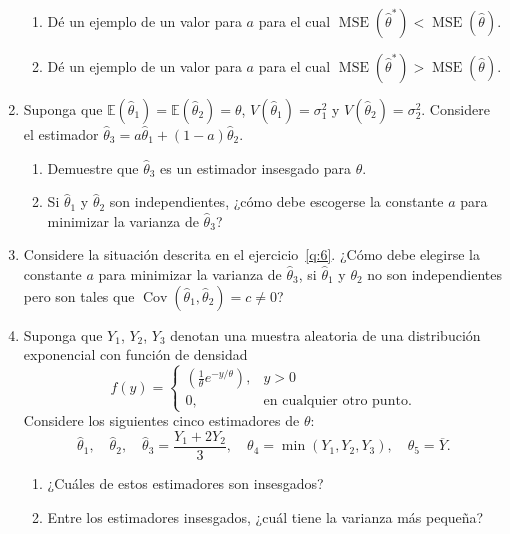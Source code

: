 \documentclass[a4paper]{scrreprt}
\begin{document}
\begin{enumerate}
\begin{enumerate}
		\item\label{q:5.b} Dé un ejemplo de un valor para $a$ para el cual $\operatorname{MSE}\left(\hat{\theta}^{\ast}\right)<\operatorname{MSE}\left(\hat{\theta}\right)$.
		\item\label{q:5.c} Dé un ejemplo de un valor para $a$ para el cual $\operatorname{MSE}\left(\hat{\theta}^{\ast}\right)>\operatorname{MSE}\left(\hat{\theta}\right)$.
	\end{enumerate}
	\item\label{q:6} Suponga que $\mathds{E}\left(\hat{\theta}_{1}\right)=\mathds{E}\left(\hat{\theta}_{2}\right)=\theta$, $V\left(\hat{\theta}_{1}\right)=\sigma^{2}_{1}$ y $V\left(\hat{\theta}_{2}\right)=\sigma^{2}_{2}$. Considere el estimador $\hat{\theta}_{3}=a\hat{\theta}_{1}+\left(1-a\right)\hat{\theta}_{2}$.
	\begin{enumerate}
		\item\label{q:6.a} Demuestre que $\hat{\theta}_{3}$ es un estimador insesgado para $\theta$.
		\item\label{q:6.b} Si $\hat{\theta}_{1}$ y $\hat{\theta}_{2}$ son independientes, ¿cómo debe escogerse la constante $a$ para minimizar la varianza de $\hat{\theta}_{3}$?
	\end{enumerate}
\item\label{q:7} Considere la situación descrita en el ejercicio~\eqref{q:6}. ¿Cómo debe elegirse la constante $a$ para minimizar la varianza de $\hat{\theta}_{3}$, si $\hat{\theta}_{1}$ y $\theta_{2}$ no son independientes pero son tales que $\operatorname{Cov}\left(\hat{\theta}_{1},\hat{\theta}_{2}\right)=c\neq0$?
\item Suponga que $Y_{1}$, $Y_{2}$, $Y_{3}$ denotan una muestra aleatoria de una distribución exponencial con función de densidad \[ f\left(y\right)=\begin{cases}\left(\frac{1}{\theta}e^{-y/\theta}\right),& y>0\\0,&\text{en cualquier otro punto}.\end{cases} \] Considere los siguientes cinco estimadores de $\theta$: \[ \hat{\theta}_{1},\quad\hat{\theta}_{2},\quad\hat{\theta}_{3}=\frac{Y_{1}+2Y_{2}}{3},\quad\theta_{4}=\min\left(Y_{1},Y_{2},Y_{3}\right),\quad\theta_{5}=\overline{Y}. \]
\begin{enumerate}
	\item ¿Cuáles de estos estimadores son insesgados?
	\item Entre los estimadores insesgados, ¿cuál tiene la varianza más pequeña?
\end{enumerate}

\end{enumerate}
\end{document}
